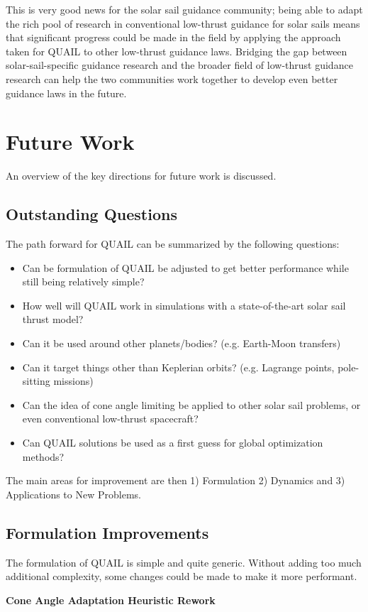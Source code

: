 This is very good news for the solar sail guidance community; being able to adapt the rich pool of research in conventional low-thrust guidance for solar sails means that significant progress could be made in the field by applying the approach taken for QUAIL to other low-thrust guidance laws. Bridging the gap between solar-sail-specific guidance research and the broader field of low-thrust guidance research can help the two communities work together to develop even better guidance laws in the future.

\section{Future Work}
An overview of the key directions for future work is discussed.
\subsection{Outstanding Questions}
The path forward for QUAIL can be summarized by the following questions:
\begin{itemize}
    \item Can be formulation of QUAIL be adjusted to get better performance while still being relatively simple?
    \item How well will QUAIL work in simulations with a state-of-the-art solar sail thrust model?
    \item Can it be used around other planets/bodies? (e.g. Earth-Moon transfers)
    \item Can it target things other than Keplerian orbits? (e.g. Lagrange points, pole-sitting missions)
    \item Can the idea of cone angle limiting be applied to other solar sail problems, or even conventional low-thrust spacecraft?
    \item Can QUAIL solutions be used as a first guess for global optimization methods?
\end{itemize}
The main areas for improvement are then 1) Formulation 2) Dynamics and 3) Applications to New Problems.

\subsection{Formulation Improvements}
The formulation of QUAIL is simple and quite generic. Without adding too much additional complexity, some changes could be made to make it more performant.

\textbf{Cone Angle Adaptation Heuristic Rework}

